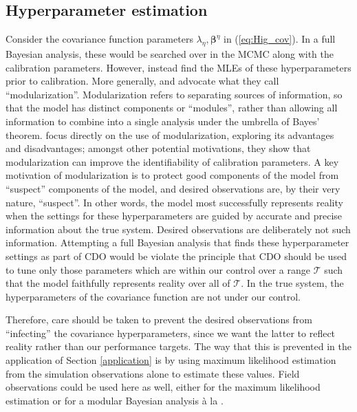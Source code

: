 \documentclass{article}
\begin{document}
\subsection{Hyperparameter estimation}\label{hyperparameter_estimation}
Consider the covariance function parameters $\lambda_\eta,\boldsymbol \beta^\eta$ in (\ref{eq:Hig_cov}). 
%
In a full Bayesian analysis, these would be searched over in the MCMC along with the calibration parameters. 
%
However, \cite{Kennedy2001} instead find the MLEs of these hyperparameters prior to calibration. 
%
More generally, \cite{Bayarri2007} and \cite{Liu2009} advocate what they call ``modularization''. 
%
Modularization refers to separating sources of information, so that the model has distinct components or ``modules'', rather than allowing all information to combine into a single analysis under the umbrella of Bayes' theorem.
%
\cite{Liu2009} focus directly on the use of modularization, exploring its advantages and disadvantages; amongst other potential motivations, they show that modularization can improve the identifiability of calibration parameters. 
%
A key motivation of modularization is to protect good components of the model from ``suspect'' components of the model, and desired observations are, by their very nature, ``suspect''. 
%
In other words, the model most successfully represents reality when the settings for these hyperparameters are guided by accurate and precise information about the true system. 
%
Desired observations are deliberately not such information. 
%
Attempting a full Bayesian analysis that finds these hyperparameter settings as part of CDO would be violate the principle that CDO should be used to tune only those parameters which are within our control over a range $\mathcal T$ such that the model faithfully represents reality over all of $\mathcal T$. 
%
In the true system, the hyperparameters of the covariance function are not under our control.

Therefore, care should be taken to prevent the desired observations from ``infecting'' the covariance hyperparameters, since we want the latter to reflect reality rather than our performance targets. The way that this is prevented in the application of Section \ref{application} is by using maximum likelihood estimation from the simulation observations alone to estimate these values. Field observations could be used here as well, either for the maximum likelihood estimation or for a modular Bayesian analysis \`a la \cite{Liu2009}.
\end{document}
